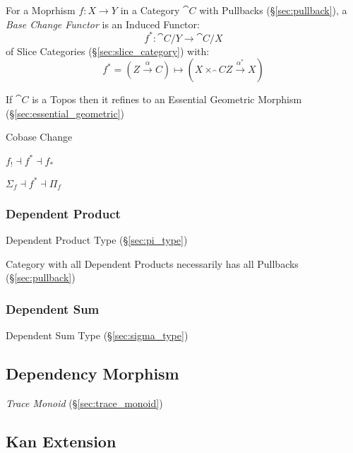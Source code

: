 For a Moprhism $f : X \rightarrow Y$ in a Category $\cat{C}$ with
Pullbacks (\S\ref{sec:pullback}), a \emph{Base Change Functor} is an
Induced Functor:
\[
  f^* : \cat{C}/Y \rightarrow \cat{C}/X
\]
of Slice Categories (\S\ref{sec:slice_category}) with:
\[
  f^* = (Z \xrightarrow{\alpha} C) \mapsto
    (X \times_\cat{C} Z \xrightarrow{\alpha^*} X)
\]

If $\cat{C}$ is a Topos then it refines to an Essential Geometric
Morphism (\S\ref{sec:essential_geometric})


Cobase Change

$f_! \dashv f^* \dashv f_*$

$\Sigma_f \dashv f^* \dashv \Pi_f$



\subsubsection{Dependent Product}\label{sec:dependent_product}

Dependent Product Type (\S\ref{sec:pi_type})

Category with all Dependent Products necessarily has all Pullbacks
(\S\ref{sec:pullback})



\subsubsection{Dependent Sum}\label{sec:dependent_sum}

Dependent Sum Type (\S\ref{sec:sigma_type})



\subsection{Dependency Morphism}\label{sec:dependency_morphism}

\emph{Trace Monoid} (\S\ref{sec:trace_monoid})



\subsection{Kan Extension}\label{sec:kan_extension}

